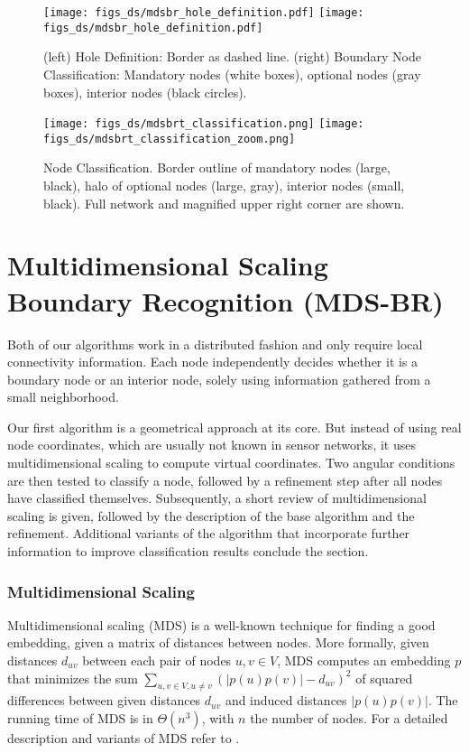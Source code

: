 \documentclass{llncs}
\begin{document}
\begin{figure}[t]
\begin{minipage}{0.48\columnwidth}
\centering
\texttt{[image: figs\_ds/mdsbr\_hole\_definition.pdf]}
\hspace{2em}
\texttt{[image: figs\_ds/mdsbr\_hole\_definition.pdf]}
\caption{(left) Hole Definition: Border as dashed line. (right) Boundary Node Classification: Mandatory nodes (white boxes), optional nodes (gray boxes), interior nodes (black circles).}\label{fig:hole_definition}
\end{minipage}
\hfill
\begin{minipage}{0.48\columnwidth}
\centering
\texttt{[image: figs\_ds/mdsbrt\_classification.png]}
\hfill
\texttt{[image: figs\_ds/mdsbrt\_classification\_zoom.png]}
\caption{Node Classification. Border outline of mandatory nodes (large, black), halo of optional nodes (large, gray), interior nodes (small, black). Full network and magnified upper right corner are shown.}\label{fig:hole_definition2}
\end{minipage}
\end{figure}


\section{Multidimensional Scaling Boundary Recognition (MDS-BR)}\label{sec:mdsbr}
Both of our algorithms work in a distributed fashion and only require local connectivity information.
Each node independently decides whether it is a boundary node or an interior node, solely using information gathered from a small neighborhood.

Our first algorithm is a geometrical approach at its core.
But instead of using real node coordinates, which are usually not known in sensor networks, it uses multidimensional scaling to compute virtual coordinates.
Two angular conditions are then tested to classify a node, followed by a refinement step after all nodes have classified themselves.
Subsequently, a short review of multidimensional scaling is given, followed by the description of the base algorithm and the refinement.
Additional variants of the algorithm that incorporate further information to improve classification results conclude the section.

\subsubsection{Multidimensional Scaling}
Multidimensional scaling (MDS) \cite{t-mdstm-52} is a well-known technique for finding a good embedding, given a matrix of distances between nodes.
More formally, given distances $d_{uv}$ between each pair of nodes $u, v \in V$, MDS computes an embedding $p$ that minimizes the sum $\sum_{u,v \in V, u \neq v} ( |p(u)p(v)| - d_{uv} )^2$ of squared differences between given distances $d_{uv}$ and induced distances $|p(u)p(v)|$.
The running time of MDS is in $\Theta(n^3)$, with $n$ the number of nodes.
For a detailed description and variants of MDS refer to \cite{cc-mds-01}.
\end{document}
